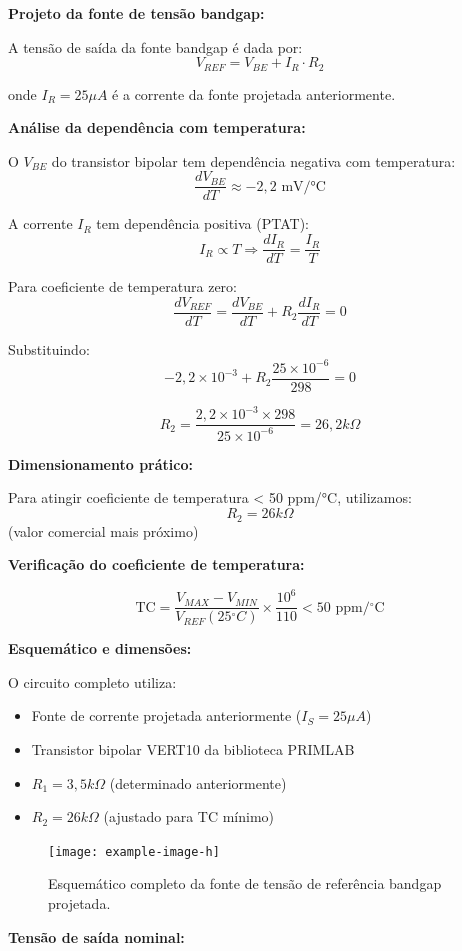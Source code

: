 ﻿\documentclass[12pt,a4paper]{article}
\newcommand{\degree}{\ensuremath{{}^\circ}}
\begin{document}
\textbf{Projeto da fonte de tensão bandgap:}

A tensão de saída da fonte bandgap é dada por:
$$V_{REF} = V_{BE} + I_R \cdot R_2$$

onde $I_R = 25\mu A$ é a corrente da fonte projetada anteriormente.

\textbf{Análise da dependência com temperatura:}

O $V_{BE}$ do transistor bipolar tem dependência negativa com temperatura:
$$\frac{dV_{BE}}{dT} \approx -2,2 \text{ mV/°C}$$

A corrente $I_R$ tem dependência positiva (PTAT):
$$I_R \propto T \Rightarrow \frac{dI_R}{dT} = \frac{I_R}{T}$$

Para coeficiente de temperatura zero:
$$\frac{dV_{REF}}{dT} = \frac{dV_{BE}}{dT} + R_2 \frac{dI_R}{dT} = 0$$

Substituindo:
$$-2,2 \times 10^{-3} + R_2 \frac{25 \times 10^{-6}}{298} = 0$$

$$R_2 = \frac{2,2 \times 10^{-3} \times 298}{25 \times 10^{-6}} = 26,2 k\Omega$$

\textbf{Dimensionamento prático:}

Para atingir coeficiente de temperatura < 50 ppm/°C, utilizamos:
$$R_2 = 26k\Omega$$ (valor comercial mais próximo)

\textbf{Verificação do coeficiente de temperatura:}

$$\text{TC} = \frac{V_{MAX} - V_{MIN}}{V_{REF}(25\degree C)} \times \frac{10^6}{110} < 50 \text{ ppm/}\degree\text{C}$$

\textbf{Esquemático e dimensões:}

O circuito completo utiliza:
\begin{itemize}
    \item Fonte de corrente projetada anteriormente ($I_S = 25\mu A$)
    \item Transistor bipolar VERT10 da biblioteca PRIMLAB
    \item $R_1 = 3,5k\Omega$ (determinado anteriormente)
    \item $R_2 = 26k\Omega$ (ajustado para TC mínimo)
\end{itemize}

\begin{figure}[H]
\centering
\texttt{[image: example-image-h]}
\caption{Esquemático completo da fonte de tensão de referência bandgap projetada.}
\label{fig:bandgap_complete}
\end{figure}

\textbf{Tensão de saída nominal:}
\end{document}
